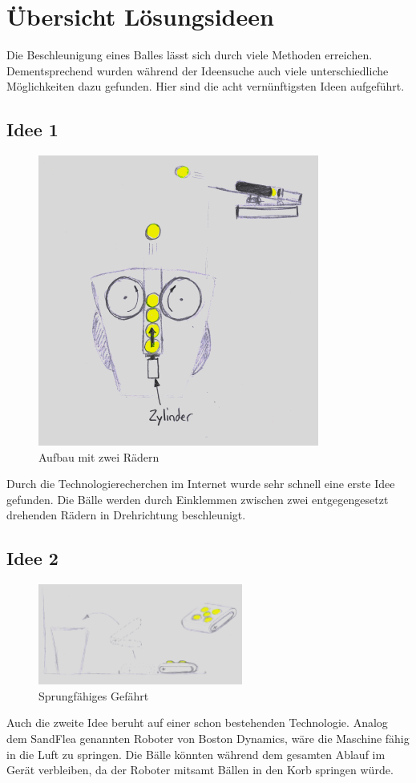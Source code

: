 \clearpage
\section{Übersicht Lösungsideen}
Die Beschleunigung eines Balles lässt sich durch viele Methoden erreichen. Dementsprechend wurden während der Ideensuche auch viele unterschiedliche Möglichkeiten dazu gefunden.
Hier sind die acht vernünftigsten Ideen aufgeführt.
\subsection{Idee 1}
\begin{figure}[h!]
	\centering
	\includegraphics[scale=0.7]{../../fig/Wurfmaschine_Drehraeder.png}
	\caption{Aufbau mit zwei Rädern}
	\label{fig:konzept1}
\end{figure}
Durch die Technologierecherchen im Internet wurde sehr schnell eine erste Idee gefunden. Die Bälle werden durch Einklemmen zwischen zwei entgegengesetzt drehenden Rädern in Drehrichtung beschleunigt.

\subsection{Idee 2}
\begin{figure}[h!]
	\centering
	\includegraphics[width=0.6\textwidth]{../../fig/Springer.jpg}
	\caption{Sprungfähiges Gefährt}
	\label{fig:springer}
\end{figure}
Auch die zweite Idee beruht auf einer schon bestehenden Technologie. Analog dem SandFlea
\cite{sandflea} genannten Roboter von Boston Dynamics, wäre die Maschine fähig in die 
Luft zu springen. Die Bälle könnten während dem gesamten Ablauf im Gerät verbleiben, da 
der Roboter mitsamt Bällen in den Korb springen würde.

